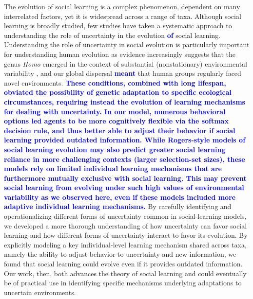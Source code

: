 \documentclass[letterpaper,11.5pt]{scrartcl}
\newcommand{\edit}[1]{{\bfseries \textcolor{blue} {#1}}}
\begin{document}
The evolution of social learning is a complex phenomenon, dependent on many interrelated factors, yet it is widespread across a
range of taxa. Although social learning is broadly studied, few studies have taken a systematic approach to understanding the role
of uncertainty in the evolution \edit{of} social learning. Understanding the role of uncertainty in social evolution is particularly important
for understanding human evolution as evidence increasingly suggests that the genus \emph{Homo} emerged in the context of substantial
(nonstationary) environmental variability \citep{anton_etal2014, levin2015}, and our global dispersal
\edit{meant} that human groups regularly faced novel environments. \edit{These conditions, combined with long lifespan, obviated the possibility of genetic adaptation to specific ecological circumstances, requiring instead the evolution of learning mechanisms for dealing with uncertainty. In our model, numerous behavioral options led agents to be more cognitively flexible via the softmax decision rule, and thus better able to adjust their behavior if social learning provided outdated information. While Rogers-style models of social learning evolution may also predict greater social learning reliance in more challenging contexts (larger selection-set sizes), these models rely on limited individual learning mechanisms that are furthermore mutually exclusive with social learning. This may prevent social learning from evolving under such high values of environmental variability as we observed here, even if these models included more adaptive individual learning mechanisms.} 
By carefully identifying and operationalizing different forms of uncertainty common in social-learning models, we developed a more thorough understanding of how uncertainty can favor social learning and how different forms of uncertainty interact to favor its evolution. By explicitly modeling a key individual-level learning mechanism shared across taxa, namely the ability to adjust behavior to uncertainty and new information, we found that social learning could evolve even if it provides outdated information. %
Our work, then, both advances the theory of social learning and could eventually be of practical use in identifying specific mechanisms underlying adaptations to uncertain environments.
\end{document}
